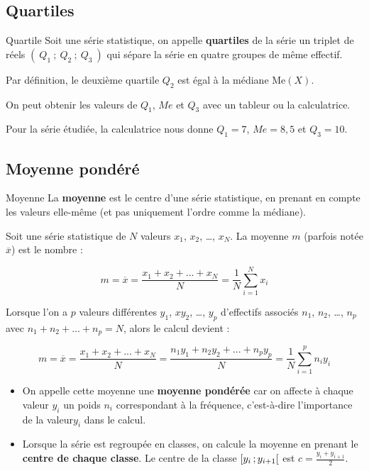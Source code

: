 \documentclass[10pt,a4paper,openany,twoside, eleve]{book}
\begin{document}
\subsection{Quartiles}

\begin{defi}{Quartile}{}
   Soit une série statistique, on appelle \textbf{quartiles} de la série un triplet de réels $(~Q_1~;~Q_2~;~Q_3~)$ qui sépare la série en quatre groupes de même effectif.

   Par définition, le deuxième quartile $Q_2$ est égal à la médiane $\text{Me}(X)$.

   \smallskip
   On peut obtenir les valeurs de $Q_1$, $Me$ et $Q_3$ avec un tableur ou la calculatrice.
\end{defi}

\begin{ex}{}{}
   Pour la série étudiée, la calculatrice nous donne $Q_1=7$, $Me=8,5$ et $Q_3=10$.
\end{ex}

\subsection{Moyenne pondéré}

\begin{defi}{Moyenne}{}
   La \textbf{moyenne} est le centre d'une série statistique, en prenant en compte les valeurs elle-même (et pas uniquement l'ordre comme la médiane).

   Soit une série statistique de $N$ valeurs $x_1$, $x_2$, \dots, $x_N$. La moyenne $m$ (parfois notée $\overline{x}$) est le nombre :

   $$m = \overline{x} = \dfrac{x_1+x_2+...+x_N}{N} = \dfrac{1}{N}\sum_{i=1}^{N}{x_i}$$

   Lorsque l'on a $p$ valeurs différentes $y_1$, $xy_2$, \dots, $y_p$ d'effectifs associés $n_1$, $n_2$, \dots, $n_p$ avec $n_1+n_2+...+n_p=N$, alors le calcul devient :

   $$m = \overline{x}= \dfrac{x_1+x_2+...+x_N}{N} = \dfrac{n_1y_1+n_2y_2+...+n_py_p}{N}=\dfrac{1}{N}\sum_{i=1}^{p}{n_iy_i}$$
\end{defi}

\begin{rems}{}{}
   \begin{itemize}
      \item On appelle cette moyenne une \textbf{moyenne pondérée} car on affecte à chaque valeur $y_i$ un \og poids \fg $n_i$ correspondant à la fréquence, c'est-à-dire l'importance de la valeur$y_i$ dans le calcul.
      \item
      Lorsque la série est regroupée en classes, on calcule la moyenne en prenant le \textbf{centre de chaque classe}. Le centre de la classe $\mathopen{[}y_i\mathclose{}\mathpunct{};y_{i+1}\mathclose{[}$ est $c=\frac{y_i+y_{i+1}}{2}$.
   \end{itemize}
\end{rems}
\end{document}
